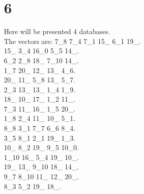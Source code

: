 \chapter{6}
\indent Here will be presented 4 databases.\\
The vectors are:
7\_8 7\_4 7\_1 15\_ 6\_1 19\_.\\15\_ 3\_4 16\_0 5\_5 14\_.\\6\_2 2\_8 18\_ 7\_10 14\_.\\1\_7 20\_ 12\_ 13\_ 4\_6.\\20\_ 11\_ 5\_8 13\_ 5\_7.\\2\_3 13\_ 13\_ 1\_4 1\_9.\\18\_ 10\_ 17\_ 1\_2 11\_.\\7\_3 11\_ 16\_ 1\_5 20\_.\\1\_8 2\_4 11\_ 10\_ 5\_1.\\8\_8 3\_1 7\_7 6\_6 8\_4.\\3\_5 8\_1 2\_1 19\_ 1\_3.\\10\_ 8\_2 19\_ 9\_5 10\_0.\\1\_10 16\_ 5\_4 19\_ 10\_.\\19\_ 13\_ 9\_10 18\_ 14\_.\\9\_7 8\_10 11\_ 12\_ 20\_.\\8\_3 5\_2 19\_ 18\_.\\